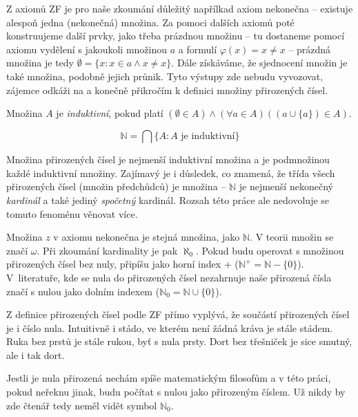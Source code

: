 Z axiomů ZF je pro naše zkoumání důležitý napřílkad axiom nekonečna -- existuje alespoň jedna (nekonečná) množina. Za pomoci dalších axiomů poté konstruujeme další prvky, jako třeba prázdnou množinu -- tu dostaneme pomocí axiomu vydělení s jakoukoli množinou $a$ a formulí $\varphi(x) = x \neq x$ -- prázdná množina je tedy $\emptyset = \{ x: x \in a \land x \neq x \}$. Dále získáváme, že sjednocení množin je také množina, podobně jejich průnik. Tyto výstupy zde nebudu vyvozovat, zájemce odkáži na \cite{TeMno} a konečně přikročím k definici množiny přirozených čísel.

\begin{definition}
Množina $A$ je \textit{induktivní}, pokud platí $(\emptyset \in A) \land (\forall a \in A)((a \cup \{ a \}) \in A)$.
\end{definition}

\begin{definition}
\begin{equation}
\mathbb{N} = \bigcap \{A : A \text{~je induktivní} \}
\end{equation}
\end{definition}

Množina přirozených čísel je nejmenší induktivní množina a je podmnožinou každé induktivní množiny. Zajímavý je i důsledek, co znamená, že třída všech přirozených čísel (množin předchůdců) je množina -- $\mathbb{N}$ je nejmenší nekonečný \textit{kardinál} a také jediný \textit{spočetný} kardinál. Rozsah této práce ale nedovoluje se tomuto fenoménu věnovat více.

\begin{remark}
Množina $z$ v axiomu nekonečna je stejná množina, jako $\mathbb{N}$. V teorii množin se značí $\omega$. Při zkoumání kardinality je pak $\aleph_0$. Pokud budu operovat s množinou přirozených čísel bez nuly, připíšu jako horní index $+$ ($\mathbb{N^+} = \mathbb{N} - \{0\}$). V~literatuře, kde se nula do přirozených čísel nezahrnuje naše přirozená čísla značí s nulou jako dolním indexem ($\mathbb{N}_0 = \mathbb{N} \cup \{0 \}$).
\end{remark}

\begin{remark}
Z definice přirozených čísel podle ZF přímo vyplývá, že součástí přirozených čísel je i číslo nula. Intuitivně i stádo, ve kterém není žádná kráva je stále stádem. Ruka bez prstů je stále rukou, byť s nula prsty. Dort bez třešniček je sice smutný, ale i tak dort.

Jestli je nula přirozená nechám spíše matematickým filosofům a v této práci, pokud neřeknu jinak, budu počítat s nulou jako přirozeným číslem. Už nikdy by zde čtenář tedy neměl vidět symbol $\mathbb{N}_0$.
\end{remark}

